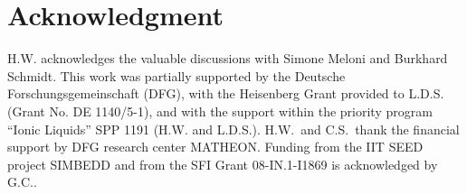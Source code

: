 \documentclass[a4paper,preprint,unsortedaddress,onecolumn]{revtex4-1}
\begin{document}
\section*{Acknowledgment}
  H.W. acknowledges the valuable discussions with Simone Meloni and Burkhard Schmidt.
  This work was partially supported by the Deutsche
  Forschungsgemeinschaft (DFG), with the Heisenberg
  Grant provided to L.D.S. (Grant No. DE 1140/5-1),
  and with the support within the priority program ``Ionic Liquids'' SPP 1191
  (H.W. and L.D.S.). 
  H.W.~and C.S.~thank the financial support by DFG research center MATHEON.
  Funding from the IIT SEED project SIMBEDD and from the SFI Grant 08-IN.1-I1869 is acknowledged by G.C..

{}









\end{document}
